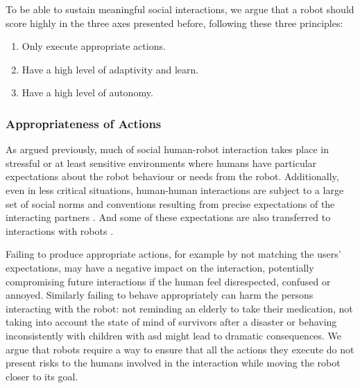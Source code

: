 	To be able to sustain meaningful social interactions, we argue that a robot should score highly in the three axes presented before, following these three principles:
	\begin{enumerate}
		\item Only execute appropriate actions.
		\item Have a high level of adaptivity and learn.
		\item Have a high level of autonomy.
	\end{enumerate}

\subsubsection{Appropriateness of Actions} \label{ssec:appropriateness} %
    As argued previously, much of social human-robot interaction takes place in  stressful or at least sensitive environments where humans have particular expectations about the robot behaviour or needs from the robot. Additionally, even in less critical situations, human-human interactions are subject to a large set of social norms and conventions resulting from precise expectations of the interacting partners \citep{sherif1936psychology}. And some of these expectations are also transferred to interactions with robots \citep{bartneck2004design}.
	
    Failing to produce appropriate actions, for example by not matching the users' expectations, may have a negative impact on the interaction, potentially compromising future interactions if the human feel disrespected, confused or annoyed. Similarly failing to behave appropriately can harm the persons interacting with the robot: not reminding an elderly to take their medication, not taking into account the state of mind of survivors after a disaster or behaving inconsistently with children with \gls{asd} might lead to dramatic consequences.  We argue that robots require a way to ensure that all the actions they execute do not present risks to the humans involved in the interaction while moving the robot closer to its goal.
	
    

